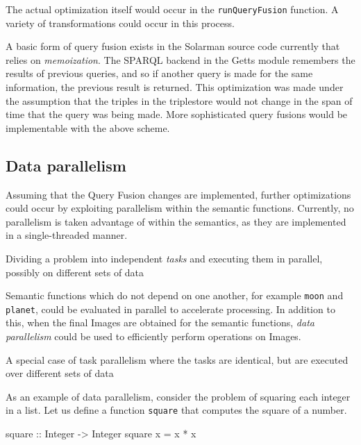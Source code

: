 \documentclass[../main.tex]{subfiles}
\begin{document}
The actual optimization itself would occur in the \texttt{runQueryFusion} function.  A variety of transformations could occur in this process.

A basic form of query fusion exists in the Solarman source code currently that relies on {\em memoization}.  The SPARQL backend in the Getts module remembers the
results of previous queries, and so if another query is made for the same information, the previous result is returned.  This optimization was made
under the assumption that the triples in the triplestore would not change in the span of time that the query was being made.  More sophisticated query fusions
would be implementable with the above scheme.

\subsection{Data parallelism}

Assuming that the Query Fusion changes are implemented, further optimizations could occur by exploiting parallelism within the semantic functions.
Currently, no parallelism is taken advantage of within the semantics, as they are implemented in a single-threaded manner.

\begin{definition}
	Dividing a problem into independent {\em tasks} and executing them in parallel, possibly on different sets of data
\end{definition}

Semantic functions which do not depend on one another, for example \texttt{moon} and \texttt{planet}, could be evaluated in parallel to accelerate processing.
In addition to this, when the final Images are obtained for the semantic functions, {\em data parallelism} could be used to efficiently perform operations
on Images.

\begin{definition}
	A special case of task parallelism where the tasks are identical, but are executed over different sets of data
\end{definition}

As an example of data parallelism, consider the problem of squaring each integer in a list. Let us define a function \texttt{square} that computes the square of a number.

\begin{code}
	square :: Integer -> Integer
	square x = x * x
\end{code}
\end{document}
